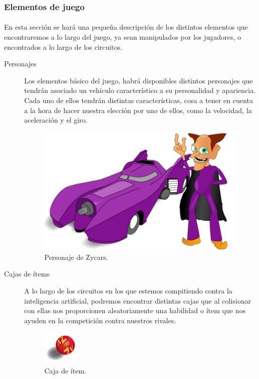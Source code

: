 \documentclass[a4paper,11pt]{article} %
\begin{document}
\subsubsection{Elementos de juego}

\paragraph{}
En esta sección se hará una pequeña descripción de los distintos elementos que encontraremos a lo largo del juego, ya sean 
manipulados por los jugadores, o encontrados a lo largo de los circuitos.


\begin{description}

\item [Personajes]
Los elementos básico del juego, habrá disponibles distintos personajes que tendrán asociado un 
vehículo característico a su personalidad y apariencia. Cada uno de ellos
tendrán distintas características, 
cosa a tener en cuenta a la hora de hacer nuestra elección por uno de ellos, como la velocidad, la aceleración y el giro.
	
\begin{figure}[H]
	\label{ejemplo_personaje2}
	\begin{center}
		\includegraphics[scale=0.4]{imagenes/ejemplo_personaje2.png}
	\end{center}
	\caption{Personaje de Zycars.}
\end{figure}

\item [Cajas de ítems]
A lo largo de los circuitos en los que estemos compitiendo contra la inteligencia artificial, 
podremos encontrar distintas cajas que al colisionar con ellas nos proporcionen
aleatoriamente una habilidad o ítem que nos
ayuden en la competición contra nuestros rivales.

\begin{figure}[H]
	\label{item_box}
	\begin{center}
		\includegraphics[scale=0.85]{imagenes/items/item_box.png}
	\end{center}
	\caption{Caja de ítem.}
\end{figure}


\end{description}
\end{document}
